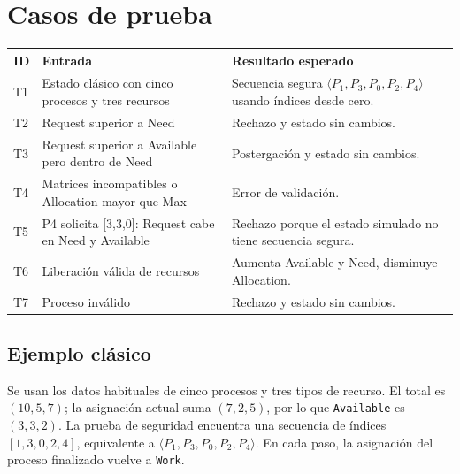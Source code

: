 \documentclass[12pt,a4paper]{article}
\begin{document}
\section{Casos de prueba}
\begin{table}[H]\centering\small
\begin{tabularx}{\linewidth}{p{1cm}X X}
\toprule
\textbf{ID} & \textbf{Entrada} & \textbf{Resultado esperado}\\\midrule
T1 & Estado clásico con cinco procesos y tres recursos & Secuencia segura $\langle P_1,P_3,P_0,P_2,P_4\rangle$ usando índices desde cero.\\
T2 & Request superior a Need & Rechazo y estado sin cambios.\\
T3 & Request superior a Available pero dentro de Need & Postergación y estado sin cambios.\\
T4 & Matrices incompatibles o Allocation mayor que Max & Error de validación.\\
T5 & P4 solicita [3,3,0]: Request cabe en Need y Available & Rechazo porque el estado simulado no tiene secuencia segura.\\
T6 & Liberación válida de recursos & Aumenta Available y Need, disminuye Allocation.\\
T7 & Proceso inválido & Rechazo y estado sin cambios.\\
\bottomrule
\end{tabularx}\end{table}
\subsection{Ejemplo clásico}
Se usan los datos habituales de cinco procesos y tres tipos de recurso. El total es $(10,5,7)$; la asignación actual suma $(7,2,5)$, por lo que \texttt{Available} es $(3,3,2)$. La prueba de seguridad encuentra una secuencia de índices $[1,3,0,2,4]$, equivalente a $\langle P_1,P_3,P_0,P_2,P_4\rangle$. En cada paso, la asignación del proceso finalizado vuelve a \texttt{Work}.
\end{document}
